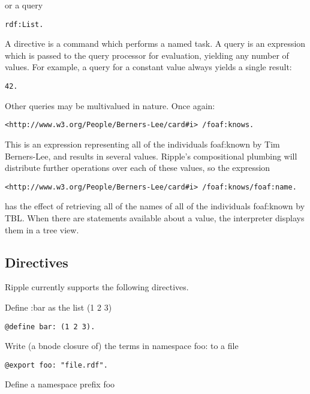 \documentclass[runningheads]{llncs}
\begin{document}
or a query

\begin{verbatim}
rdf:List.
\end{verbatim}

A directive is a command which performs a named task.  A query is an expression which is passed to the query processor for evaluation, yielding any number of values.  For example, a query for a constant value always yields a single result:

\begin{verbatim}
42.
\end{verbatim}

Other queries may be multivalued in nature.  Once again:

\begin{verbatim}
<http://www.w3.org/People/Berners-Lee/card#i> /foaf:knows.
\end{verbatim}

This is an expression representing all of the individuals foaf:known by Tim
Berners-Lee, and results in several values.  Ripple's compositional plumbing
will distribute further operations over each of these values, so the expression

\begin{verbatim}
<http://www.w3.org/People/Berners-Lee/card#i> /foaf:knows/foaf:name.
\end{verbatim}

has the effect of retrieving all of the names of all of the individuals
foaf:known by TBL.  When there are statements available about a value, the
interpreter displays them in a tree view.


\subsection{Directives}

Ripple currently supports the following directives.
\newline

Define :bar as the list (1 2 3)

\begin{verbatim}
@define bar: (1 2 3).
\end{verbatim}

Write (a bnode closure of) the terms in namespace foo: to a file

\begin{verbatim}
@export foo: "file.rdf".
\end{verbatim}

Define a namespace prefix foo
\end{document}
